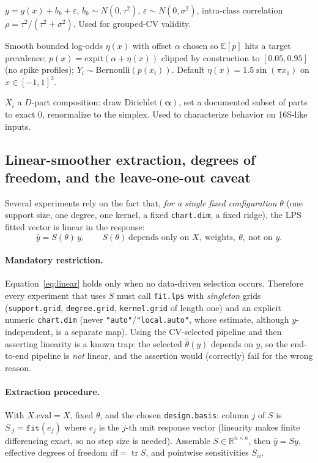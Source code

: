 \documentclass[11pt]{article}
\newcommand{\code}[1]{\texttt{#1}}
\newcommand{\tr}{\operatorname{tr}}
\newcommand{\E}{\mathbb{E}}
\begin{document}
\begin{description}[leftmargin=0em,style=nextline]
$y=g(x)+b_k+\varepsilon$, $b_k\sim N(0,\tau^2)$, $\varepsilon\sim N(0,\sigma^2)$, intra-class
correlation $\rho=\tau^2/(\tau^2+\sigma^2)$. Used for grouped-CV validity.
\item[G6 — binary surface.] Smooth bounded log-odds $\eta(x)$ with offset $\alpha$ chosen so
$\E[p]$ hits a target prevalence; $p(x)=\mathrm{expit}(\alpha+\eta(x))$ clipped by construction
to $[0.05,0.95]$ (no spike profiles); $Y_i\sim\mathrm{Bernoulli}(p(x_i))$. Default
$\eta(x)=1.5\sin(\pi x_1)$ on $x\in[-1,1]^2$.
\item[G7 — compositional / structural zeros.] $X_i$ a $D$-part composition: draw
$\mathrm{Dirichlet}(\boldsymbol\alpha)$, set a documented subset of parts to exact $0$, renormalize
to the simplex. Used to characterize behavior on 16S-like inputs.
\end{description}

\subsection{Linear-smoother extraction, degrees of freedom, and the leave-one-out caveat}
\label{sec:smoother}

Several experiments rely on the fact that, \emph{for a single fixed configuration} $\theta$
(one support size, one degree, one kernel, a fixed \code{chart.dim}, a fixed ridge), the LPS
fitted vector is linear in the response:
\begin{equation}
\hat y = S(\theta)\,y, \qquad S(\theta)\ \text{depends only on } X,\ \text{weights},\ \theta,\ \text{not on } y.
\label{eq:linear}
\end{equation}

\paragraph{Mandatory restriction.} Equation~\eqref{eq:linear} holds only when no
data-driven selection occurs. Therefore every experiment that uses $S$ must call
\code{fit.lps} with \emph{singleton} grids (\code{support.grid}, \code{degree.grid},
\code{kernel.grid} of length one) and an explicit numeric \code{chart.dim} (never
\code{"auto"}/\code{"local.auto"}, whose estimate, although $y$-independent, is a separate
map). Using the CV-selected pipeline and then asserting linearity is a known trap: the
selected $\hat\theta(y)$ depends on $y$, so the end-to-end pipeline is \emph{not} linear,
and the assertion would (correctly) fail for the wrong reason.

\paragraph{Extraction procedure.} With $X.\mathrm{eval}=X$, fixed $\theta$, and the chosen
\code{design.basis}: column $j$ of $S$ is $S_{\cdot j} = \texttt{fit}(e_j)$ where $e_j$ is the
$j$-th unit response vector (linearity makes finite differencing exact, so no step size is
needed). Assemble $S\in\mathbb{R}^{n\times n}$, then $\hat y = Sy$, effective degrees of
freedom $\mathrm{df}=\tr S$, and pointwise sensitivities $S_{ii}$.
\end{document}
